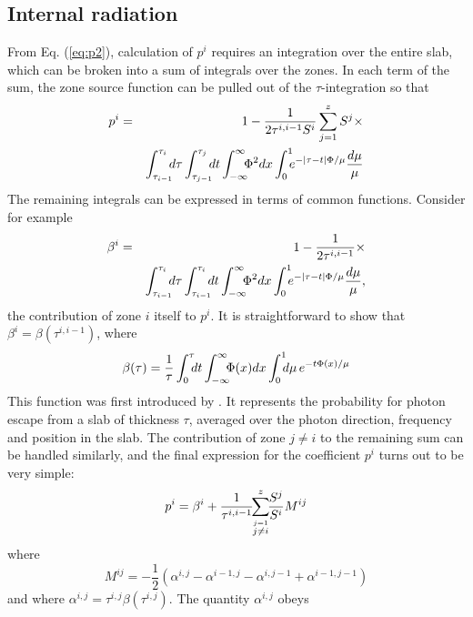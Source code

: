 \documentclass[12pt]{article}
\def\non{\nonumber \\}
\def\t(#1){\tau^{#1}}
\def\a(#1){\alpha^{#1}}
\begin{document}
\subsection{Internal radiation}
From Eq. (\ref{eq:p2}), calculation of $p^i$ requires an integration over the
entire slab, which can be broken into a sum of integrals over the zones. In
each term of the sum, the zone source function can be pulled out of the
$\tau$-integration so that
\begin{eqnarray}
    p^i &= &1 - {1\over2\t(i,i-1)S^i}
         \sum_{j = 1}^z S^j \times \non
         &&\int_{\tau_{i - 1}}^{\tau_{i}}\!\!\!d\tau
         \int_{\tau_{j - 1}}^{\tau_{j}}\!\!\! dt
                 \int_{-\infty}^{\infty}\!\!\!\Phi^2dx
                \int_0^1\!\!\! e^{-|\tau - t|\Phi/\mu}{d\mu\over\mu}
\end{eqnarray}
The remaining integrals can be expressed in terms of common functions. Consider
for example
\begin{eqnarray}
    \beta^i &=& 1 - {1\over2\t(i,i-1)}\times \non
         &&\int_{\tau_{i - 1}}^{\tau_{i}}\!\!\!d\tau
          \int_{\tau_{i - 1}}^{\tau_{i}}\!\!\!dt
                 \int_{-\infty}^{\infty}\!\!\!\Phi^2dx
                \int_0^1\!\!\! e^{-|\tau - t|\Phi/\mu}{d\mu\over\mu},
\end{eqnarray}
the contribution of zone $i$ itself to $p^i$. It is straightforward to show
that $\beta^i = \beta(\t(i,i - 1))$, where
\begin{equation}
\label{eq:beta}
  \beta(\tau) = {1\over\tau}\int_0^\tau \!\!\!dt
                            \int_{-\infty}^{\infty}\!\!\!\Phi(x)dx
                            \int_0^1 \!\!\!d\mu\, e^{-t\Phi(x)/\mu}
\end{equation}
This function was first introduced by \cite{capriotti65}. It represents the probability
for photon escape from a slab of thickness $\tau$, averaged over the photon
direction, frequency and position in the slab. The contribution of zone $j \ne
i$ to the remaining sum can be handled similarly, and the final expression for
the coefficient $p^i$ turns out to be very simple:
\begin{equation}
\label{eq:pi}
     p^i = \beta^i + {1\over\t(i,i-1)}\!\!
     \sum_{\stackrel{j = 1}{j \ne i}}^z \!\! {S^j\over S^i} M^{ij}
\end{equation}
where
\begin{equation}
\label{eq:M}
    M^{ij} = -\frac12(\a(i,j) - \a(i-1,j) - \a(i,j-1) + \a(i-1,j-1))
\end{equation}
and where $\a(i,j) = \t(i,j)\beta(\t(i,j))$. The quantity $\a(i,j)$ obeys
\end{document}
